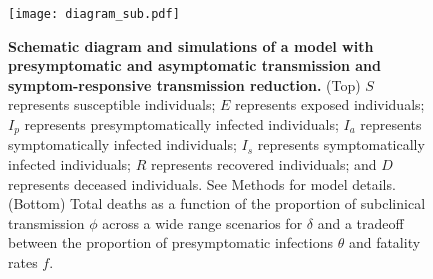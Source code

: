 \documentclass[12pt]{article}
\begin{document}
\pagebreak

\begin{figure}[!ht]
\begin{center}
\texttt{[image: diagram\_sub.pdf]}
\caption{
\textbf{Schematic diagram and simulations of a model with presymptomatic and asymptomatic transmission and symptom-responsive transmission reduction.}
(Top) $S$ represents susceptible individuals; $E$ represents exposed individuals; $I_p$ represents presymptomatically infected individuals; $I_a$ represents symptomatically infected individuals; $I_s$ represents symptomatically infected individuals; $R$ represents recovered individuals; and $D$ represents deceased individuals. See Methods for model details.
(Bottom) Total deaths as a function of the proportion of subclinical transmission $\phi$ across a wide range scenarios for $\delta$ and a tradeoff between the proportion of presymptomatic infections $\theta$ and fatality rates $f$.
}
\end{center}
\end{figure}

\pagebreak


\end{document}
